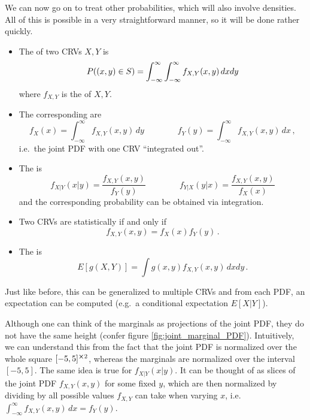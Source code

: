 We can now go on to treat other probabilities, which will also involve densities. All of this is possible in a very straightforward manner, so it will be done rather quickly.
\begin{defi}
\begin{itemize}
\item The  of two CRVs $X, Y$ is
\begin{equation}
P\qty((x, y) \in S) = \int_{- \infty}^\infty \int_{- \infty}^\infty f_{X, Y}(x, y) \, dx dy
\end{equation}
where $f_{X, Y}$ is the  of $X, Y$.


\item The corresponding  are
\begin{equation}
f_X(x) = \int_{- \infty}^\infty f_{X, Y}(x, y) \, dy \qquad \qquad f_Y(y) = \int_{- \infty}^\infty f_{X, Y}(x, y) \, dx \, ,
\end{equation}
i.e.~the joint PDF with one CRV \enquote{integrated out}.


\item The  is
\begin{equation}\label{eq:joint_pdf}
f_{X | Y}(x | y) = \frac{f_{X, Y}(x, y)}{f_Y(y)} \qquad \qquad f_{Y | X}(y | x) = \frac{f_{X, Y}(x, y)}{f_X(x)}
\end{equation}
and the corresponding probability can be obtained via integration.\footnotemark


\item Two CRVs are statistically  if and only if
\begin{equation}
f_{X, Y}(x, y) = f_X(x) f_Y(y) \, .
\end{equation}


\item The  is
\begin{equation}\label{eq:unc_stat_crv}
E[g(X, Y)] = \int g(x, y) f_{X, Y}(x, y) \, dx dy \, .
\end{equation}
\end{itemize}

Just like before, this can be generalized to multiple CRVs and from each PDF, an expectation can be computed (e.g.~a conditional expectation $E[X | Y]$).
\end{defi}
Although one can think of the marginals as projections of the joint PDF, they do not have the same height (confer figure \ref{fig:joint_marginal_PDF}). Intuitively, we can understand this from the fact that the joint PDF is normalized over the whole square $[-5, 5]^{\cross 2}$, whereas the marginals are normalized over the interval $[-5, 5]$. The same idea is true for $f_{X | Y}(x | y)$. It can be thought of as slices of the joint PDF $f_{X, Y}(x, y)$ for some fixed $y$, which are then normalized by dividing by all possible values $f_{X, Y}$ can take when varying $x$, i.e.~$\int_{- \infty}^\infty f_{X, Y}(x, y) \, dx = f_Y(y)$.




